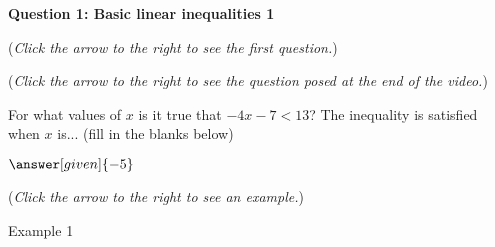 \documentclass{ximera}
\begin{document}
\textbf{Question 1: Basic linear inequalities 1}
\begin{question}
\begin{flushright}
{\color{blue}(\emph{Click the arrow to the right to see the first question.})}
\end{flushright}
\begin{expandable}
\begin{center}
\end{center}
\begin{flushleft}
{\color{blue}(\emph{Click the arrow to the right to see the question
posed at the end of the video.})}
\end{flushleft}
\begin{expandable}
\begin{center}
For what values of $x$ is it true that $-4x-7 <13$?  The inequality is satisfied when $x$ is... (fill in the blanks below) \\
\end{center}
\begin{prompt}
\begin{center} 

 $\answer[given]{-5}$\\
\end{center}
\end{prompt}
\begin{flushright}
{\color{blue}(\emph{Click the arrow to the right to see an example.})}
\end{flushright}
\begin{expandable}
\begin{center}
\begin{center}
Example 1
\end{center}
\end{center}
\end{expandable}
\end{expandable}
\end{expandable}
\end{question}
\end{document}
